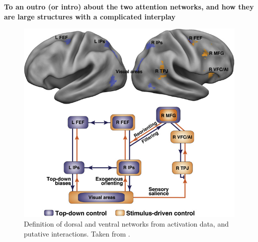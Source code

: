 \documentclass[a4paper, 12pt]{scrreprt}
\begin{document}
\textbf{To an outro (or intro) about the two attention networks, and how they are large structures with a complicated interplay}
\begin{figure}[H]
	\includegraphics[scale=0.4]{img/attentionnetworks.png}
	\caption[Dorsal and ventral attention networks]
	{\small{Definition of dorsal and ventral networks from activation data, and putative interactions. Taken from \textcite{corbetta2008reorienting}.}}
	\label{fig:Networks}
\end{figure}
\end{document}
